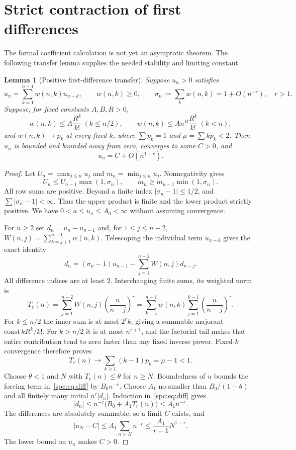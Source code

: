 \documentclass[11pt,letterpaper]{article}
\newtheorem{lemma}[theorem]{Lemma}
\theoremstyle{definition}\newtheorem{definition}[theorem]{Definition}
\theoremstyle{remark}\newtheorem{remark}[theorem]{Remark}
\begin{document}
\section{Strict contraction of first differences}\label{spc:sec:contraction}
The formal coefficient calculation is not yet an asymptotic theorem. The following transfer lemma supplies the needed stability and limiting constant.
\begin{lemma}[Positive first-difference transfer]\label{spc:lem:transfer}
Suppose $u_n>0$ satisfies
\[
 u_n=\sum_{k=1}^{n-1}w(n,k)u_{n-k},\qquad w(n,k)\ge0,
 \qquad \sigma_n:=\sum_kw(n,k)=1+O(n^{-r}),\quad r>1.
\]
Suppose, for fixed constants $A,B,R>0$,
\[
 w(n,k)\le A\frac{R^k}{k!}\ (k\le n/2),\qquad
 w(n,k)\le An^B\frac{R^k}{k!}\ (k<n),
\]
and $w(n,k)\to p_k$ at every fixed $k$, where $\sum p_k=1$ and $\mu=\sum kp_k<2$. Then $u_n$ is bounded and bounded away from zero, converges to some $C>0$, and
\[
 u_n=C+O(n^{1-r}).
\]
\end{lemma}
\begin{proof}
Let $U_n=\max_{j\le n}u_j$ and $m_n=\min_{j\le n}u_j$. Nonnegativity gives
\[
 U_n\le U_{n-1}\max(1,\sigma_n),\qquad
 m_n\ge m_{n-1}\min(1,\sigma_n).
\]
All row sums are positive. Beyond a finite index $|\sigma_n-1|\le1/2$, and $\sum|\sigma_n-1|<\infty$. Thus the upper product is finite and the lower product strictly positive. We have $0<a\le u_n\le A_0<\infty$ without assuming convergence.

For $n\ge2$ set $d_n=u_n-u_{n-1}$ and, for $1\le j\le n-2$,
$W(n,j)=\sum_{k=j+1}^{n-1}w(n,k)$. Telescoping the individual term $u_{n-k}$ gives the exact identity
\begin{equation}\label{spc:eq:diff}
 d_n=(\sigma_n-1)u_{n-1}-\sum_{j=1}^{n-2}W(n,j)d_{n-j}.
\end{equation}
All difference indices are at least $2$. Interchanging finite sums, its weighted norm is
\begin{equation}\label{spc:eq:T}
 T_r(n)=\sum_{j=1}^{n-2}W(n,j)\left(\frac n{n-j}\right)^r
 =\sum_{k=1}^{n-1}w(n,k)\sum_{j=1}^{k-1}\left(\frac n{n-j}\right)^r.
\end{equation}
For $k\le n/2$ the inner sum is at most $2^rk$, giving a summable majorant $\mathrm{const}\,kR^k/k!$. For $k>n/2$ it is at most $n^{r+1}$, and the factorial tail makes that entire contribution tend to zero faster than any fixed inverse power. Fixed-$k$ convergence therefore proves
\begin{equation}\label{spc:eq:Tlimit}
 T_r(n)\longrightarrow\sum_{k\ge1}(k-1)p_k=\mu-1<1.
\end{equation}
Choose $\theta<1$ and $N$ with $T_r(n)\le\theta$ for $n\ge N$. Boundedness of $u$ bounds the forcing term in~\eqref{spc:eq:diff} by $B_0n^{-r}$. Choose $A_1$ no smaller than $B_0/(1-\theta)$ and all finitely many initial $n^r|d_n|$. Induction in~\eqref{spc:eq:diff} gives
\[
 |d_n|\le n^{-r}\bigl(B_0+A_1T_r(n)\bigr)\le A_1n^{-r}.
\]
The differences are absolutely summable, so a limit $C$ exists, and
\begin{equation}\label{spc:eq:Ctail}
 |u_N-C|\le A_1\sum_{n>N}n^{-r}\le\frac{A_1}{r-1}N^{1-r}.
\end{equation}
The lower bound on $u_n$ makes $C>0$.
\end{proof}
\end{document}
